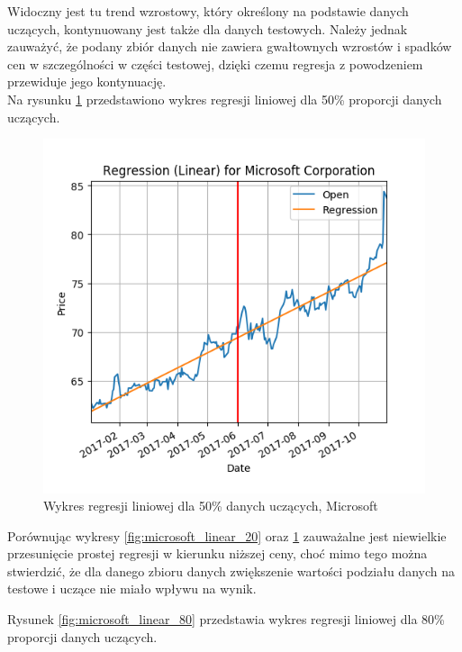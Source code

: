 Widoczny jest tu trend wzrostowy, który określony na podstawie danych uczących, kontynuowany jest także dla danych testowych.
Należy jednak zauważyć, że podany zbiór danych nie zawiera gwałtownych wzrostów i spadków cen w szczególności w części testowej, dzięki czemu regresja z powodzeniem przewiduje jego kontynuację.\\

Na rysunku \ref{fig:microsoft_linear_50} przedstawiono wykres regresji liniowej dla 50\% proporcji danych uczących.
\begin{figure}[h!]
\centering
\includegraphics[width=150mm]{pictures/plots/microsoft_linear_50.png}
\caption{Wykres regresji liniowej dla 50\% danych uczących, Microsoft}
\label{fig:microsoft_linear_50}
\end{figure}

Porównując wykresy \ref{fig:microsoft_linear_20} oraz \ref{fig:microsoft_linear_50} zauważalne jest niewielkie przesunięcie prostej regresji w kierunku niższej ceny, 
choć mimo tego można stwierdzić, że dla danego zbioru danych zwiększenie wartości podziału danych na testowe i uczące nie miało wpływu na wynik.

Rysunek \ref{fig:microsoft_linear_80} przedstawia wykres regresji liniowej dla 80\% proporcji danych uczących.\\

